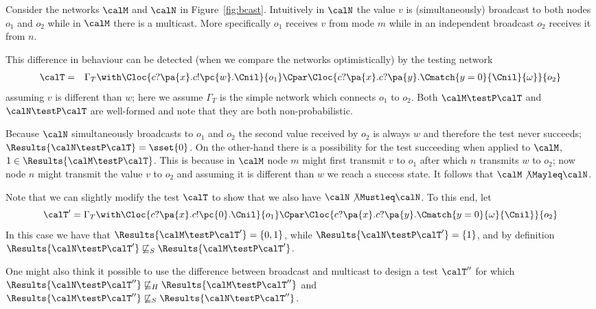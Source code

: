 \documentclass{LMCS}
\begin{document}
 \begin{exa}\label{ex:bcast1}
   Consider the networks $\calM$ and $\calN$ in Figure~\ref{fig:bcast}. 
Intuitively in $\calN$ the value $v$ is (simultaneously) broadcast to both nodes $o_1$
and $o_2$ while in $\calM$ there is a multicast. More specifically $o_1$ receives $v$ from
mode $m$ while in an independent broadcast $o_2$ receives it from $n$. 

This difference in behaviour can be detected (when we compare the networks optimistically) by the testing network
\begin{eqnarray*}
  \calT &=& \Gamma_T \with \Cloc{c?\pa{x}.c!\pc{w}.\Cnil}{o_1} \Cpar \Cloc{c?\pa{x}.c?\pa{y}. \Cmatch{y=0}{\Cnil}{\omega}}{o_2}
\end{eqnarray*}
assuming $v$ is different than $w$; here we assume $\Gamma_T$ is the simple network which connects $o_1$ to 
$o_2$.  
Both $\calM \testP \calT$ and $\calN \testP \calT$ are well-formed and note that
they are both non-probabilistic. 

Because $\calN$ simultaneously broadcasts to $o_1$ and $o_2$ the second value received by
$o_2$ is always $w$ and therefore the test never succeeds; $\Results{\calN \testP \calT} = \sset{0}$. 
On the other-hand there is a possibility for the test succeeding when applied to $\calM$, 
$ 1 \in \Results{\calM \testP \calT}$.  This is because in $\calM$ node $m$ might first transmit $v$ to 
$o_1$ after which $n$ transmits $w$ to $o_2$; now node $n$ might transmit the value $v$ to $o_2$ 
and assuming it is different than $w$ we reach a success state. It follows that 
$\calM \not\Mayleq \calN$. 

Note that we can slightly modify the test $\calT$ to show that we 
also have $\calN \not\Mustleq \calN$. To this end, let 
\[
\calT' = \Gamma_T \with \Cloc{c?\pa{x}.c!\pc{0}.\Cnil}{o_1} \Cpar \Cloc{c?\pa{x}.c?\pa{y}. \Cmatch{y=0}{\omega}{\Cnil}}{o_2}
\]
In this case we have that $\Results{\calM \testP \calT'} = \{0,1\}$, while 
$\Results{\calN \testP \calT'} = \{1\}$, and by definition 
$\Results{\calN \testP \calT'} \not\sqsubseteq_{S} \Results{\calM \testP \calT'}$.

One might also think it possible to use the difference between broadcast and multicast to design a test 
$\calT''$ for which 
$\Results{\calN \testP \calT''} \not\sqsubseteq_{H} \Results{\calM \testP \calT''}$ 
and $\Results{\calM \testP \calT''} \not\sqsubseteq_{S} \Results{\calN \testP \calT''}$. 


\end{exa}
\end{document}
